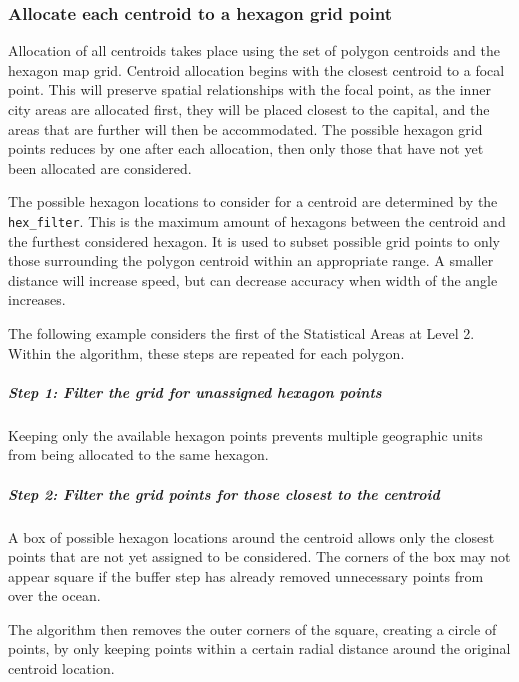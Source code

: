\documentclass{monashthesis}
\begin{document}
\hypertarget{allocate-each-centroid-to-a-hexagon-grid-point}{%
\subsubsection{Allocate each centroid to a hexagon grid point}\label{allocate-each-centroid-to-a-hexagon-grid-point}}

Allocation of all centroids takes place using the set of polygon centroids and the hexagon map grid.
Centroid allocation begins with the closest centroid to a focal point.
This will preserve spatial relationships with the focal point, as the inner city areas are allocated first, they will be placed closest to the capital, and the areas that are further will then be accommodated.
The possible hexagon grid points reduces by one after each allocation, then only those that have not yet been allocated are considered.

The possible hexagon locations to consider for a centroid are determined by the \texttt{hex\_filter}. This is the maximum amount of hexagons between the centroid and the furthest considered hexagon. It is used to subset possible grid points to only those surrounding the polygon centroid within an appropriate range. A smaller distance will increase speed, but can decrease accuracy when width of the angle increases.

The following example considers the first of the Statistical Areas at Level 2.
Within the algorithm, these steps are repeated for each polygon.

\hypertarget{step-1-filter-the-grid-for-unassigned-hexagon-points}{%
\subparagraph{Step 1: Filter the grid for unassigned hexagon points}\label{step-1-filter-the-grid-for-unassigned-hexagon-points}}

Keeping only the available hexagon points prevents multiple geographic units from being allocated to the same hexagon.

\hypertarget{step-2-filter-the-grid-points-for-those-closest-to-the-centroid}{%
\subparagraph{Step 2: Filter the grid points for those closest to the centroid}\label{step-2-filter-the-grid-points-for-those-closest-to-the-centroid}}

A box of possible hexagon locations around the centroid allows only the closest points that are not yet assigned to be considered. The corners of the box may not appear square if the buffer step has already removed unnecessary points from over the ocean.

The algorithm then removes the outer corners of the square, creating a circle of points, by only keeping points within a certain radial distance around the original centroid location.
\end{document}
